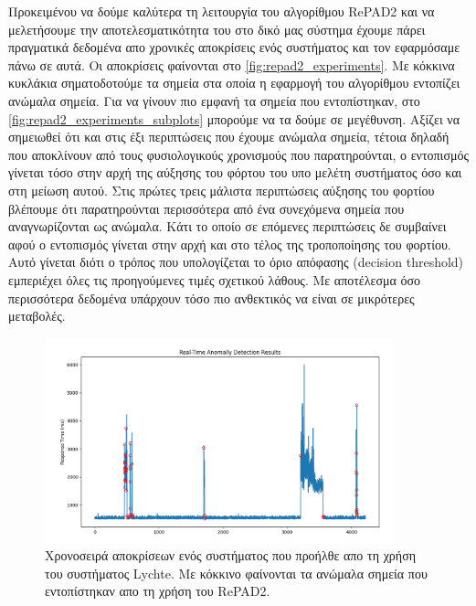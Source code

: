 Προκειμένου να δούμε καλύτερα τη λειτουργία του αλγορίθμου RePAD2 και να μελετήσουμε την αποτελεσματικότητα του στο δικό μας σύστημα έχουμε πάρει πραγματικά δεδομένα απο χρονικές αποκρίσεις ενός συστήματος και τον εφαρμόσαμε πάνω σε αυτά. Οι αποκρίσεις φαίνονται στο \autoref{fig:repad2_experiments}. Με κόκκινα κυκλάκια σηματοδοτούμε τα σημεία στα οποία η εφαρμογή του αλγορίθμου εντοπίζει ανώμαλα σημεία. Για να γίνουν πιο εμφανή τα σημεία που εντοπίστηκαν, στο \autoref{fig:repad2_experiments_subplots} μπορούμε να τα δούμε σε μεγέθυνση. Αξίζει να σημειωθεί ότι και στις έξι περιπτώσεις που έχουμε ανώμαλα σημεία, τέτοια δηλαδή που αποκλίνουν από τους φυσιολογικούς χρονισμούς που παρατηρούνται, ο εντοπισμός γίνεται τόσο στην αρχή της αύξησης του φόρτου του υπο μελέτη συστήματος όσο και στη μείωση αυτού. Στις πρώτες τρεις μάλιστα περιπτώσεις αύξησης του φορτίου βλέπουμε ότι παρατηρούνται περισσότερα από ένα συνεχόμενα σημεία που αναγνωρίζονται ως ανώμαλα. Κάτι το οποίο σε επόμενες περιπτώσεις δε συμβαίνει αφού ο εντοπισμός γίνεται στην αρχή και στο τέλος της τροποποίησης του φορτίου. Αυτό γίνεται διότι ο τρόπος που υπολογίζεται το όριο απόφασης (decision threshold) εμπεριέχει όλες τις προηγούμενες τιμές σχετικού λάθους. Με αποτέλεσμα όσο περισσότερα δεδομένα υπάρχουν τόσο πιο ανθεκτικός να είναι σε μικρότερες μεταβολές.

\begin{figure}
    \centering
	\includegraphics[width=0.9\textwidth]{./images/chapter4/timeseries_repad2_experiment.png}
	\caption[Χρονοσειρά αποκρίσεων ενός συστήματος που προήλθε απο τη χρήση του συστήματος Lychte. Με κόκκινο φαίνονται τα ανώμαλα σημεία που εντοπίστηκαν απο τη χρήση του RePAD2.]{Χρονοσειρά αποκρίσεων ενός συστήματος που προήλθε απο τη χρήση του συστήματος Lychte. Με κόκκινο φαίνονται τα ανώμαλα σημεία που εντοπίστηκαν απο τη χρήση του RePAD2.}
	\label{fig:repad2_experiments}
\end{figure}

